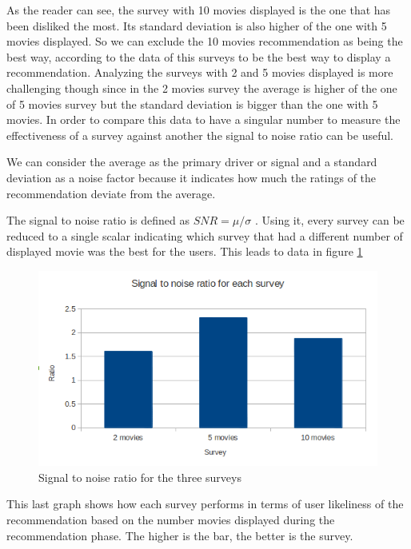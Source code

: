 As the reader can see, the survey with 10 movies displayed is the one that has been disliked the most. Its standard deviation is also higher of the one with 5 movies displayed. So we can exclude the 10 movies recommendation as being the best way, according to the data of this surveys to be the best way to display a recommendation. Analyzing the surveys with 2 and 5 movies displayed is more challenging though since in the 2 movies survey the average is higher of the one of 5 movies survey but the standard deviation is bigger than the one with 5 movies. In order to compare this data to have a singular number to measure the effectiveness of a survey against another the signal to noise ratio can be useful.

We can consider the average as the primary driver or signal and a standard deviation as a noise factor because it indicates how much the ratings of the recommendation deviate from the average. 

The signal to noise ratio is defined as 
\begin{math}
SNR=\mu/\sigma  
\end{math}
. Using it, every survey can be reduced to a single scalar indicating which survey that had a different number of displayed movie was the best for the users. This leads to data in figure \ref{fig:research_signal_to_noise}

\begin{figure}
  \centering
  \includegraphics[width=\textwidth]{figures/research_signal_to_noise_ratio.png}
  \caption{Signal to noise ratio for the three surveys}
  \label{fig:research_signal_to_noise}
\end{figure}

This last graph shows how each survey performs in terms of user likeliness of the recommendation based on the number movies displayed during the recommendation phase. The higher is the bar, the better is the survey.

